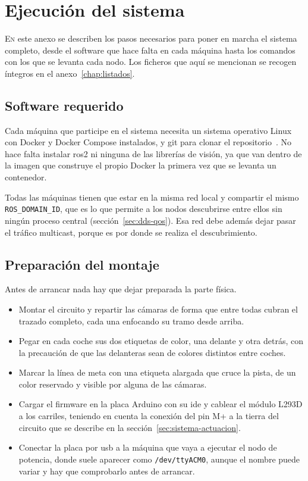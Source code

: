 \chapter{Ejecución del sistema}
\label{chap:execucion}

\lettrine{E}{n} este anexo se describen los pasos necesarios para poner en marcha el sistema completo, desde el software que hace falta en cada máquina hasta los comandos con los que se levanta cada nodo. Los ficheros que aquí se mencionan se recogen íntegros en el anexo~\ref{chap:listados}.

\section{Software requerido}
\label{sec:software-requerido}

Cada máquina que participe en el sistema necesita un sistema operativo Linux con Docker y Docker Compose instalados, y git para clonar el repositorio~\cite{repogithub}. No hace falta instalar \gls{ros2} ni ninguna de las librerías de visión, ya que van dentro de la imagen que construye el propio Docker la primera vez que se levanta un contenedor.

Todas las máquinas tienen que estar en la misma red local y compartir el mismo \texttt{ROS\_DOMAIN\_ID}, que es lo que permite a los nodos descubrirse entre ellos sin ningún proceso central (sección~\ref{sec:dds-qos}). Esa red debe además dejar pasar el tráfico multicast, porque es por donde se realiza el descubrimiento.

\section{Preparación del montaje}
\label{sec:preparacion-hardware}

Antes de arrancar nada hay que dejar preparada la parte física.

\begin{itemize}
    \item Montar el circuito y repartir las cámaras de forma que entre todas cubran el trazado completo, cada una enfocando su tramo desde arriba.
    \item Pegar en cada coche sus dos etiquetas de color, una delante y otra detrás, con la precaución de que las delanteras sean de colores distintos entre coches.
    \item Marcar la línea de meta con una etiqueta alargada que cruce la pista, de un color reservado y visible por alguna de las cámaras.
    \item Cargar el firmware en la placa Arduino con su \gls{ide} y cablear el módulo L293D a los carriles, teniendo en cuenta la conexión del pin M+ a la tierra del circuito que se describe en la sección~\ref{sec:sistema-actuacion}.
    \item Conectar la placa por \gls{usb} a la máquina que vaya a ejecutar el nodo de potencia, donde suele aparecer como \texttt{/dev/ttyACM0}, aunque el nombre puede variar y hay que comprobarlo antes de arrancar.
\end{itemize}

